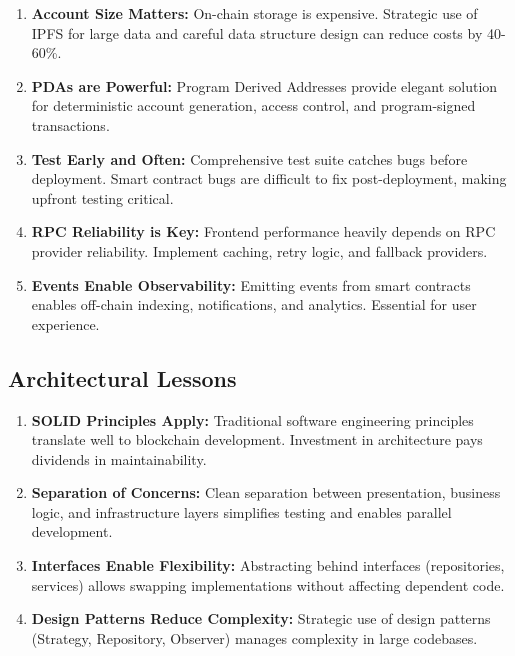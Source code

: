 \documentclass[a4paper,13pt,twoside]{report}
\theoremstyle{definition}
\begin{document}
\begin{enumerate}
    \item \textbf{Account Size Matters:} On-chain storage is expensive. Strategic use of IPFS for large data and careful data structure design can reduce costs by 40-60\%.

    \item \textbf{PDAs are Powerful:} Program Derived Addresses provide elegant solution for deterministic account generation, access control, and program-signed transactions.

    \item \textbf{Test Early and Often:} Comprehensive test suite catches bugs before deployment. Smart contract bugs are difficult to fix post-deployment, making upfront testing critical.

    \item \textbf{RPC Reliability is Key:} Frontend performance heavily depends on RPC provider reliability. Implement caching, retry logic, and fallback providers.

    \item \textbf{Events Enable Observability:} Emitting events from smart contracts enables off-chain indexing, notifications, and analytics. Essential for user experience.
\end{enumerate}

\subsection{Architectural Lessons}

\begin{enumerate}
    \item \textbf{SOLID Principles Apply:} Traditional software engineering principles translate well to blockchain development. Investment in architecture pays dividends in maintainability.

    \item \textbf{Separation of Concerns:} Clean separation between presentation, business logic, and infrastructure layers simplifies testing and enables parallel development.

    \item \textbf{Interfaces Enable Flexibility:} Abstracting behind interfaces (repositories, services) allows swapping implementations without affecting dependent code.

    \item \textbf{Design Patterns Reduce Complexity:} Strategic use of design patterns (Strategy, Repository, Observer) manages complexity in large codebases.
\end{enumerate}
\end{document}
